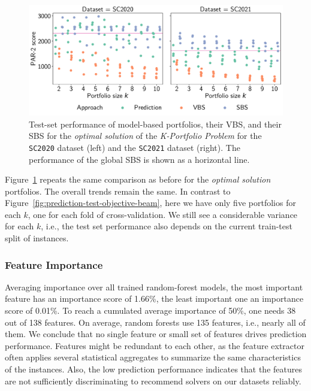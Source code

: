 \documentclass[a4paper,USenglish,pdfa]{lipics-v2021} %
\begin{document}
\begin{figure}[tb]
	\centering
	\includegraphics[width=\columnwidth]{plots/prediction-test-objective-optimal.pdf}
	\caption{
		Test-set performance of model-based portfolios, their VBS, and their SBS for the \emph{optimal solution} of the \emph{K-Portfolio Problem} for the \texttt{SC2020} dataset (left) and the \texttt{SC2021} dataset (right).
		The performance of the global SBS is shown as a horizontal line.
	}
	\label{fig:prediction-test-objective-optimal}
\end{figure}

Figure~\ref{fig:prediction-test-objective-optimal} repeats the same comparison as before for the \emph{optimal solution} portfolios.
The overall trends remain the same.
In contrast to Figure~\ref{fig:prediction-test-objective-beam}, here we have only five portfolios for each $k$, one for each fold of cross-validation.
We still see a considerable variance for each $k$, i.e., the test set performance also depends on the current train-test split of instances.

\subsubsection{Feature Importance}

Averaging importance over all trained random-forest models, the most important feature has an importance score of 1.66\%, the least important one an importance score of 0.01\%.
To reach a cumulated average importance of 50\%, one needs 38 out of 138 features.
On average, random forests use 135 features, i.e., nearly all of them.
We conclude that no single feature or small set of features drives prediction performance.
Features might be redundant to each other, as the feature extractor often applies several statistical aggregates to summarize the same characteristics of the instances.
Also, the low prediction performance indicates that the features are not sufficiently discriminating to recommend solvers on our datasets reliably.
\end{document}
